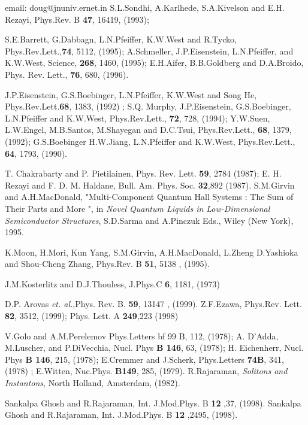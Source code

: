 \begin{references}

 email: doug@jnuniv.ernet.in
 S.L.Sondhi, A.Karlhede, S.A.Kivelson and E.H. Rezayi,
Phys.Rev. B {\bf 47}, 16419, (1993); 

 S.E.Barrett, G.Dabbagn, L.N.Pfeiffer, K.W.West
 and R.Tycko, Phys.Rev.Lett.,{\bf 74}, 5112, (1995); A.Schmeller,
 J.P.Eisenstein, L.N.Pfeiffer, and K.W.West, Science, {\bf 268}, 
 1460, (1995); E.H.Aifer, B.B.Goldberg and  D.A.Broido, Phys. Rev.
 Lett., {\bf 76}, 680, (1996).

 J.P.Eisenstein, G.S.Boebinger, L.N.Pfeiffer,
K.W.West and Song He, Phys.Rev.Lett.{\bf 68}, 1383, (1992) ; S.Q.
Murphy, J.P.Eisenstein, G.S.Boebinger, L.N.Pfeiffer and
K.W.West, Phys.Rev.Lett., {\bf 72}, 728, (1994); Y.W.Suen,
L.W.Engel, M.B.Santos, M.Shayegan and D.C.Tsui, Phys.Rev.Lett.,
{\bf 68}, 1379, (1992);  G.S.Boebinger H.W.Jiang, L.N.Pfeiffer
and  K.W.West, Phys.Rev.Lett., {\bf 64}, 1793, (1990).

 T. Chakrabarty and P. Pietilainen, Phys. Rev. Lett. {\bf 59},
2784 (1987); E. H. Rezayi and F. D. M. Haldane, Bull. Am. Phys. Soc. {\bf
32},892 (1987).
 S.M.Girvin and A.H.MacDonald, "Multi-Component Quantum Hall
Systems : The Sum of Their Parts and More ",  in {\it Novel Quantum 
Liquids in Low-Dimensional Semiconductor Structures}, S.D.Sarma and A.Pinczuk
Eds., Wiley (New York), 1995.

 K.Moon, H.Mori, Kun Yang, S.M.Girvin, A.H.MacDonald, L.Zheng
D.Yashioka and Shou-Cheng Zhang, Phys.Rev. B {\bf 51}, 5138 , (1995).

 J.M.Kosterlitz and D.J.Thouless, J.Phys.C {\bf 6}, 1181, (1973)

 D.P. Arovas {\sl et. al.},Phys. Rev. B. {\bf 59},
13147 , (1999).
 Z.F.Ezawa, Phys.Rev. Lett.  {\bf 82}, 3512, (1999);
 Phys. Lett. A {\bf 249},223 (1998)


 V.Golo and A.M.Perelemov Phys.Letters {bf 99 B}, 112, (1978);
A. D'Adda, M.Luscher,  and P.DiVecchia, Nucl. Phys {\bf B 146}, 63, (1978);
H. Eichenherr, Nucl. Phys {\bf B 146}, 215, (1978); E.Cremmer and 
J.Scherk, Phys.Letters {\bf 74B}, 341, (1978) ; E.Witten, Nuc.Phys. 
{\bf B149}, 285, (1979).
 R.Rajaraman,  {\it Solitons and Instantons}, North Holland,
 Amsterdam, (1982).

 Sankalpa Ghosh and R.Rajaraman, Int. J.Mod.Phys. B
{\bf 12} ,37, (1998).
 Sankalpa Ghosh and R.Rajaraman, Int. J.Mod.Phys. B
{\bf 12} ,2495, (1998).



\end{references}
